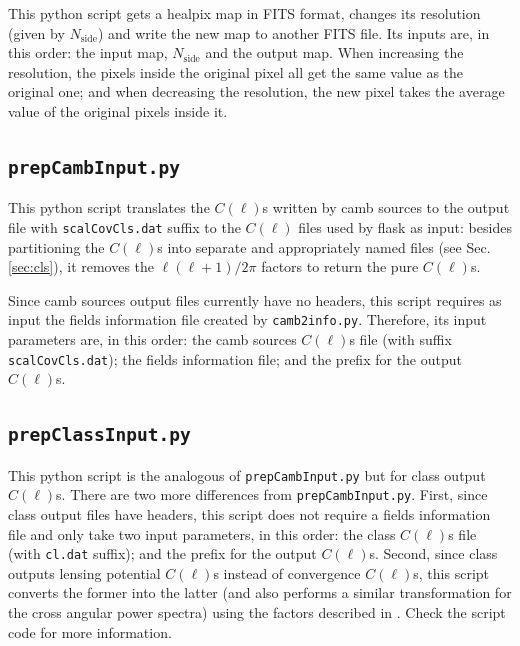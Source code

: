 \documentclass[12pt]{book} %
\newcommand{\nv}[1]{\mathrm{#1}}                 %
\begin{document}
This {\sc python} script gets a {\sc healpix} map in FITS format, changes its 
resolution (given by $N_{\nv{side}}$) and write the new map 
to another FITS file. Its inputs are, in this order: the input map, $N_{\nv{side}}$ 
and the output map. When increasing the resolution, the pixels inside the original 
pixel all get the same value as the original one; and when decreasing the resolution, the new pixel takes 
the average value of the original pixels inside it. 

\subsection{{\tt prepCambInput.py}}
\label{sec:prepcambinput}

This {\sc python} script translates the $C(\ell)$s written by {\sc camb sources} to the 
output file with {\tt scalCovCls.dat} suffix to the $C(\ell)$ files used by {\sc flask} 
as input: besides partitioning the $C(\ell)$s into separate and appropriately named files  
(see Sec. \ref{sec:cls}), it removes the $\ell(\ell+1)/2\pi$ factors to return the pure 
$C(\ell)$s. 

Since {\sc camb sources} output files currently have no headers, this script requires 
as input the fields information file created by {\tt camb2info.py}. Therefore, its input 
parameters are, in this order: the {\sc camb sources} $C(\ell)$s file (with suffix {\tt scalCovCls.dat}); 
the fields information file; and the prefix for the output $C(\ell)$s.

\subsection{{\tt prepClassInput.py}}
\label{sec:prepclassinput}

This {\sc python} script is the analogous of {\tt prepCambInput.py} but for {\sc class} 
output $C(\ell)$s. There are two more differences from {\tt prepCambInput.py}. First, since 
{\sc class} output files have headers, this script does not require a fields information 
file and only take two input parameters, in  this order: the {\sc class} $C(\ell)$s file 
(with {\tt cl.dat} suffix); and the prefix for the output $C(\ell)$s. Second, since 
{\sc class} outputs lensing potential $C(\ell)$s instead of convergence $C(\ell)$s, this script 
converts the former into the latter (and also performs a similar transformation for the cross angular power spectra) using the 
factors described in \citet{Hu00x}. Check the script code for more information. 
\end{document}
